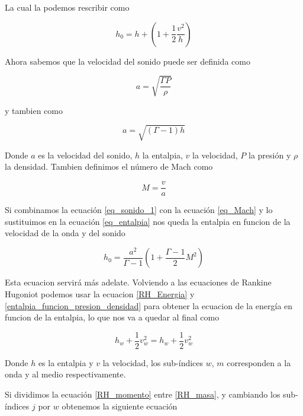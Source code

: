 \documentclass[12pt,a4paper]{book}
\begin{document}
La cual la podemos rescribir como

\begin{equation} \label{eq_entalpia}
	h_0 = h + \left( 1 +\frac{1}{2} \frac{v^2}{h} \right)
\end{equation}

Ahora sabemos que la velocidad del sonido puede ser definida como 

\begin{equation} \label{eq_sonido_1}
	a = \sqrt{\frac{\Gamma P}{\rho}}
\end{equation}

y tambien como 

\begin{equation} \label{eq_sonido_2}
	a = \sqrt{(\Gamma-1) h}
\end{equation}

Donde $a$ es la velocidad del sonido, $h$ la entalpia, $v$ la velocidad, $P$ la presión y $\rho$ la densidad. Tambien definimos el número de Mach como 

\begin{equation} \label{eq_Mach}
	M = \frac{v}{a}
\end{equation}

Si combinamos la ecuación \ref{eq_sonido_1} con la ecuación \ref{eq_Mach} y lo sustituimos en la ecuación \ref{eq_entalpia} nos queda la entalpia en funcion de la velocidad de la onda y del sonido

\begin{equation} \label{h_0_funcion_aire_mach}
	h_0 = \frac{a^2}{\Gamma - 1} \left( 1 + \frac{\Gamma - 1}{2} M^2 \right)
\end{equation}

Esta ecuacion servirá más adelate. Volviendo a las ecuaciones de Rankine Hugoniot podemos usar la ecuacion
\ref{RH_Energia} y \ref{entalpia_funcion_presion_densidad} para obtener la ecuacion de la energía en funcion de la entalpia, lo que nos va a quedar al final como

\begin{equation}\label{RH_entalpia}
  h_w +\frac{1}{2}v_w^2 = h_w +\frac{1}{2}v_w^2
\end{equation} 


Donde $ h $ es la entalpia y $v$ la velocidad, los sub-índices $w$, $m$ corresponden a la onda y al medio respectivamente.

Si dividimos la ecuación \ref{RH_momento} entre \ref{RH_masa}, y cambiando los sub-índices $j$ por $w$
obtenemos la siguiente ecuación 
\end{document}
